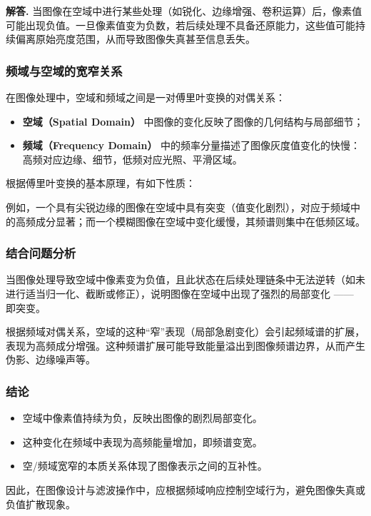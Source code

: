 \documentclass[12pt, a4paper, oneside]{ctexart}
\numberwithin{equation}{section}  %
\newenvironment{solution}[1][]{\par\noindent\textbf{#1解答. }}{\smallskip\par}  %
\begin{document}
\begin{solution}
当图像在空域中进行某些处理（如锐化、边缘增强、卷积运算）后，像素值可能出现负值。一旦像素值变为负数，若后续处理不具备还原能力，这些值可能持续偏离原始亮度范围，从而导致图像失真甚至信息丢失。

\subsubsection*{频域与空域的宽窄关系}

在图像处理中，空域和频域之间是一对傅里叶变换的对偶关系：

\begin{itemize}
  \item \textbf{空域（Spatial Domain）} 中图像的变化反映了图像的几何结构与局部细节；
  \item \textbf{频域（Frequency Domain）} 中的频率分量描述了图像灰度值变化的快慢：高频对应边缘、细节，低频对应光照、平滑区域。
\end{itemize}

根据傅里叶变换的基本原理，有如下性质：

\begin{center}
\end{center}

例如，一个具有尖锐边缘的图像在空域中具有突变（值变化剧烈），对应于频域中的高频成分显著；而一个模糊图像在空域中变化缓慢，其频谱则集中在低频区域。

\subsubsection*{结合问题分析}

当图像处理导致空域中像素变为负值，且此状态在后续处理链条中无法逆转（如未进行适当归一化、截断或修正），说明图像在空域中出现了强烈的局部变化 —— 即突变。

根据频域对偶关系，空域的这种“窄”表现（局部急剧变化）会引起频域谱的扩展，表现为高频成分增强。这种频谱扩展可能导致能量溢出到图像频谱边界，从而产生伪影、边缘噪声等。

\subsubsection*{结论}

\begin{itemize}
  \item 空域中像素值持续为负，反映出图像的剧烈局部变化。
  \item 这种变化在频域中表现为高频能量增加，即频谱变宽。
  \item 空/频域宽窄的本质关系体现了图像表示之间的互补性。
\end{itemize}

因此，在图像设计与滤波操作中，应根据频域响应控制空域行为，避免图像失真或负值扩散现象。
\end{solution}
\end{document}
